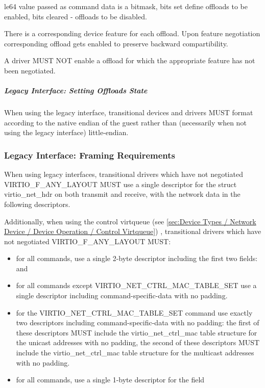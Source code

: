 le64 value passed as command data is a bitmask, bits set define
offloads to be enabled, bits cleared - offloads to be disabled.

There is a corresponding device feature for each offload. Upon feature
negotiation corresponding offload gets enabled to preserve backward
compartibility.


A driver MUST NOT enable a offload for which the appropriate feature
has not been negotiated.

\subparagraph{Legacy Interface: Setting Offloads State}\label{sec:Device Types / Network Device / Device Operation / Control Virtqueue / Offloads State Configuration / Setting Offloads State / Legacy Interface: Setting Offloads State}
When using the legacy interface, transitional devices and drivers
MUST format 
according to the native endian of the guest rather than
(necessarily when not using the legacy interface) little-endian.


\subsubsection{Legacy Interface: Framing Requirements}\label{sec:Device
Types / Network Device / Legacy Interface: Framing Requirements}

When using legacy interfaces, transitional drivers which have not
negotiated VIRTIO_F_ANY_LAYOUT MUST use a single descriptor for the
struct virtio_net_hdr on both transmit and receive, with the
network data in the following descriptors.

Additionally, when using the control virtqueue (see \ref{sec:Device
Types / Network Device / Device Operation / Control Virtqueue})
, transitional drivers which have not
negotiated VIRTIO_F_ANY_LAYOUT MUST:
\begin{itemize}
\item for all commands, use a single 2-byte descriptor including the first two
fields:  and 
\item for all commands except VIRTIO_NET_CTRL_MAC_TABLE_SET
use a single descriptor including command-specific-data
with no padding.
\item for the VIRTIO_NET_CTRL_MAC_TABLE_SET command use exactly
two descriptors including command-specific-data with no padding:
the first of these descriptors MUST include the
virtio_net_ctrl_mac table structure for the unicast addresses with no padding,
the second of these descriptors MUST include the
virtio_net_ctrl_mac table structure for the multicast addresses
with no padding.
\item for all commands, use a single 1-byte descriptor for the
 field
\end{itemize}

